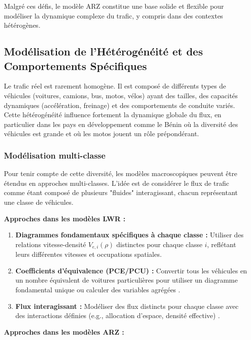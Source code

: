 Malgré ces défis, le modèle ARZ constitue une base solide et flexible pour modéliser la dynamique complexe du trafic, y compris dans des contextes hétérogènes.

\subsection{Modélisation de l'Hétérogénéité et des Comportements Spécifiques}
Le trafic réel est rarement homogène. Il est composé de différents types de véhicules (voitures, camions, bus, motos, vélos) ayant des tailles, des capacités dynamiques (accélération, freinage) et des comportements de conduite variés. Cette hétérogénéité influence fortement la dynamique globale du flux, en particulier dans les pays en développement comme le Bénin où la diversité des véhicules est grande et où les motos jouent un rôle prépondérant.

\subsubsection{Modélisation multi-classe}
Pour tenir compte de cette diversité, les modèles macroscopiques peuvent être étendus en approches multi-classes. L'idée est de considérer le flux de trafic comme étant composé de plusieurs "fluides" interagissant, chacun représentant une classe de véhicules.

\textbf{Approches dans les modèles LWR :}

\begin{enumerate}
    \item \textbf{Diagrammes fondamentaux spécifiques à chaque classe :} Utiliser des relations vitesse-densité $V_{e,i}(\rho)$ distinctes pour chaque classe $i$, reflétant leurs différentes vitesses et occupations spatiales.
    \item \textbf{Coefficients d'équivalence (PCE/PCU) :} Convertir tous les véhicules en un nombre équivalent de voitures particulières pour utiliser un diagramme fondamental unique ou calculer des variables agrégées \cite{RambhaN/ACE269Lec12}.
    \item \textbf{Flux interagissant :} Modéliser des flux distincts pour chaque classe avec des interactions définies (e.g., allocation d'espace, densité effective) \cite{RambhaN/ACE269Lec12}.
\end{enumerate}

\textbf{Approches dans les modèles ARZ :}

